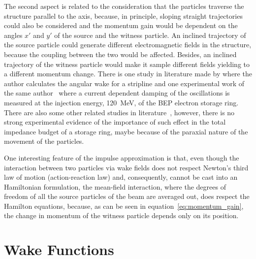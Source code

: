     The second aspect is related to the consideration that the particles traverse the structure parallel to the axis, because, in principle, sloping straight trajectories could also be considered and the momentum gain would be dependent on the angles $x'$ and $y'$ of the source and the witness particle. An inclined trajectory of the source particle could generate different electromagnetic fields in the structure, because the coupling between the two would be affected. Besides, an inclined trajectory of the witness particle would make it sample different fields yielding to a different momentum change. There is one study in literature made by  where the author calculates the angular wake for a stripline and one experimental work of the same author~\cite{Danilov1993} where a current dependent damping of the oscillations is measured at the injection energy, \SI{120}{\mega\electronvolt}, of the BEP electron storage ring. There are also some other related studies in literature~\cite{Jones1998}, however, there is no strong experimental evidence of the importance of such effect in the total impedance budget of a storage ring, maybe because of the paraxial nature of the movement of the particles.

    One interesting feature of the impulse approximation is that, even though the interaction between two particles via wake fields does not respect Newton's third law of motion (action-reaction law) and, consequently, cannot be cast into an Hamiltonian formulation, the mean-field interaction, where the degrees of freedom of all the source particles of the beam are averaged out, does respect the Hamilton equations, because, as can be seen in equation~\eqref{eq:momentum_gain}, the change in momentum of the witness particle depends only on its position.

\section{Wake Functions}\label{sec:wake_functions}

